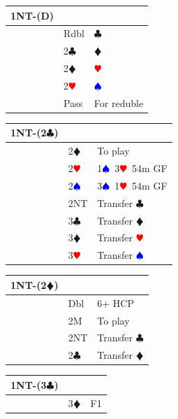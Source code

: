 \documentclass[a4paper]{article}
\newcommand{\BC}{\textcolor{OliveGreen}{$\clubsuit$}}
\newcommand{\BD}{\textcolor{RedOrange}{$\vardiamondsuit$}}
\newcommand{\BH}{\textcolor{Red}{$\varheartsuit${}}}
\newcommand{\BS}{\textcolor{Blue}{$\spadesuit${}}}
\begin{document}
\begingroup
\renewcommand{\arraystretch}{1.4}
\begin{xltabular}{\linewidth}{|l|l|X|}
\hline
1NT-(D) &  &  \\
\hline
 & Rdbl & \BC \\
\hline
 & 2\BC & \BD \\
\hline
 & 2\BD & \BH \\
\hline
 & 2\BH & \BS \\
\hline
 & Pass & For reduble \\
\hline
\end{xltabular}
\endgroup
\bigbreak
\begingroup
\renewcommand{\arraystretch}{1.4}
\begin{xltabular}{\linewidth}{|l|l|X|}
\hline
1NT-(2\BC) &  &  \\
\hline
 & 2\BD & To play \\
\hline
 & 2\BH & 1\BS\ 3\BH\ 54m GF \\
\hline
 & 2\BS & 3\BS\ 1\BH\ 54m GF \\
\hline
 & 2NT & Transfer \BC \\
\hline
 & 3\BC & Transfer \BD \\
\hline
 & 3\BD & Transfer \BH \\
\hline
 & 3\BH & Transfer \BS \\
\hline
\end{xltabular}
\endgroup
\bigbreak
\begingroup
\renewcommand{\arraystretch}{1.4}
\begin{xltabular}{\linewidth}{|l|l|X|}
\hline
1NT-(2\BD) &  &  \\
\hline
 & Dbl & 6+ HCP \\
\hline
 & 2M & To play \\
\hline
 & 2NT & Transfer \BC \\
\hline
 & 2\BC & Transfer \BD \\
\hline
\end{xltabular}
\endgroup
\bigbreak
\begingroup
\renewcommand{\arraystretch}{1.4}
\begin{xltabular}{\linewidth}{|l|l|X|}
\hline
1NT-(3\BC) &  &  \\
\hline
 & 3\BD & F1 \\
\hline
\end{xltabular}
\endgroup
\bigbreak
\begingroup
\renewcommand{\arraystretch}{1.4}
\end{document}
